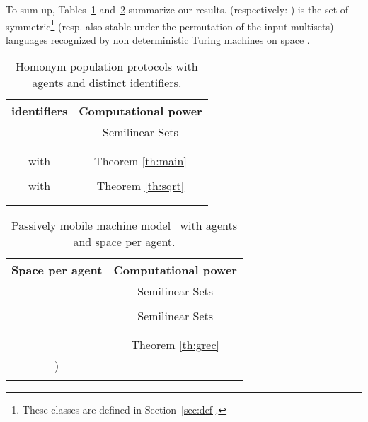 \documentclass[UKenglish]{llncs}
\begin{document}
To sum up, Tables~\ref{tab:Guerraoui}
and~\ref{tab:Chatzigiannakis} summarize  our results. 
 (respectively:  ) is the set of
-symmetric\footnote{These classes are defined in Section~\ref{sec:def}.} (resp. also stable under
the permutation of the input multisets) 
languages recognized by non deterministic Turing
machines on space . 
   \begin{table}
\vspace{-0.3cm}
\begin{center}
\begin{tabular}{c|c}
 identifiers   &  Computational power\\\hline
 & Semilinear Sets \\
& \cite{angluin2007cpp,AspnesADFP2004} \\  \hline
 &
 \\
with &   Theorem \ref{th:main} \\ 
\hline
&   \\
with & Theorem \ref{th:sqrt} \\
\hline 
 &  \\
& \cite{guerraoui2009names} \\\end{tabular}
\end{center}
\caption{Homonym population
protocols with  agents and  distinct identifiers.}
\label{tab:Guerraoui}

    \end{table}




\begin{table}
\vspace{-1.5cm}
\begin{center}
\begin{tabular}{c|c}
Space per agent  & Computational power \\\hline
   & Semilinear Sets  \\
                      &  \cite{angluin2007cpp,AspnesADFP2004}  \\  \hline
    &  Semilinear Sets  \\
                                             &
              \cite{chatzigiannakis2011passively} \\ \hline
       &    \\
                                     &  Theorem \ref{th:grec}\\ \hline
) &  \\
   &    \cite{chatzigiannakis2011passively} \\
\end{tabular}
\end{center}
      \caption{Passively mobile
machine model~\cite{chatzigiannakis2011passively}
with  agents and space  per agent.}
\label{tab:Chatzigiannakis}

 \end{table}
\end{document}
